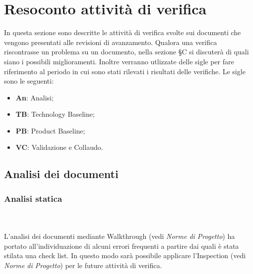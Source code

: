 \section{Resoconto attività di verifica}
In questa sezione sono descritte le attività di verifica svolte sui documenti che vengono presentati alle revisioni di avanzamento. Qualora una verifica riscontrasse un problema su un documento, nella sezione \S C si discuterà di quali siano i possibili miglioramenti.
Inoltre verranno utlizzate delle sigle per fare riferimento al periodo in cui sono stati rilevati i risultati delle verifiche. Le sigle sono le seguenti:
\begin{itemize}
\item \textbf{An}: Analisi;
\item \textbf{TB}: Technology Baseline;
\item \textbf{PB}: Product Baseline;
\item \textbf{VC}: Validazione e Collaudo. 
\end{itemize}

\subsection{Analisi dei documenti}
\subsubsection{Analisi statica} \mbox{} \\ \mbox{} \\
L'analisi dei documenti mediante Walkthrough (vedi \textit{Norme di Progetto}) ha portato all'individuazione di alcuni errori frequenti a partire dai quali è stata stilata una check list. In questo modo sarà possibile applicare l’Inspection (vedi \textit{Norme di Progetto}) per le future attività di verifica.



